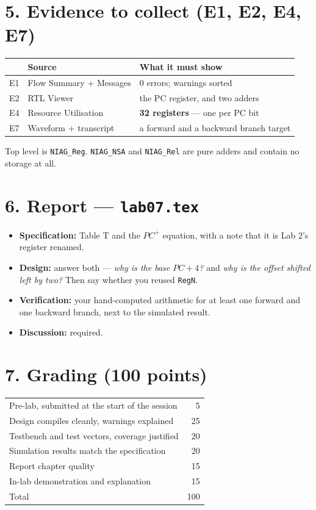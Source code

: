 \documentclass[11pt]{article}
\newcommand{\code}[1]{\texttt{#1}}
\begin{document}
\section*{5. Evidence to collect (E1, E2, E4, E7)}

\begin{center}
\begin{tabular}{lll}
\toprule
& Source & What it must show \\
\midrule
E1 & Flow Summary + Messages & 0 errors; warnings sorted \\
E2 & RTL Viewer & the PC register, and two adders \\
E4 & Resource Utilisation & \textbf{32 registers} --- one per PC bit \\
E7 & Waveform + transcript & a forward and a backward branch target \\
\bottomrule
\end{tabular}
\end{center}

Top level is \code{NIAG\_Reg}. \code{NIAG\_NSA} and \code{NIAG\_Rel} are pure
adders and contain no storage at all.

\section*{6. Report --- \code{lab07.tex}}

\begin{itemize}[leftmargin=1.6em,itemsep=1pt]
\item \textbf{Specification:} Table T and the $PC^{+}$ equation, with a note
that it is Lab 2's register renamed.
\item \textbf{Design:} answer both --- \emph{why is the base $PC+4$?} and
\emph{why is the offset shifted left by two?} Then say whether you reused
\code{RegN}.
\item \textbf{Verification:} your hand-computed arithmetic for at least one
forward and one backward branch, next to the simulated result.
\item \textbf{Discussion:} required.
\end{itemize}

\section*{7. Grading (100 points)}

\begin{center}
\begin{tabular}{lr}
\toprule
Pre-lab, submitted at the start of the session & 5 \\
Design compiles cleanly, warnings explained & 25 \\
Testbench and test vectors, coverage justified & 20 \\
Simulation results match the specification & 20 \\
Report chapter quality & 15 \\
In-lab demonstration and explanation & 15 \\
\midrule
Total & 100 \\
\bottomrule
\end{tabular}
\end{center}
\end{document}
